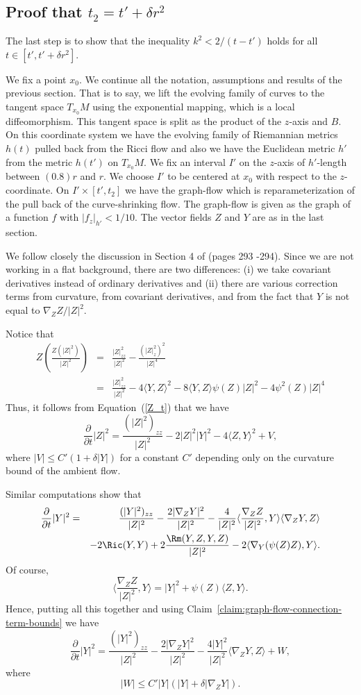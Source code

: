 \subsection{Proof that $t_2=t'+\delta r^2$}

The last step is to show that the inequality $k^2< 2/(t-t')$ holds
for all $t\in [t',t'+\delta r^2]$.

 We fix a point $x_0$. We continue all the notation, assumptions and results of the previous section.
 That is to say, we lift the evolving family of curves to the tangent space $T_{x_0}M$
 using the exponential mapping, which is a
 local diffeomorphism. This tangent space is split as the
product of the $z$-axis and $B$. On this coordinate system we have
the evolving family of Riemannian metrics $h(t)$ pulled back from
the Ricci flow and also we have the Euclidean metric $h'$ from the
metric $h(t')$ on $T_{x_0}M$. We fix an interval $I'$ on the
$z$-axis
  of $h'$-length between $(0.8)r$ and $r$.    We choose $I'$ to be centered at
 $x_0$ with respect to the $z$-coordinate. On $I'\times [t',t_2]$
  we have the graph-flow  which is reparameterization
  of the pull back of the curve-shrinking flow. The graph-flow is given as the graph
  of a function $f$ with $|f_z|_{h'}<1/10$. The vector fields $Z$
  and $Y$ are as in the last section.

 We follow closely the discussion in Section 4 of \cite{AG} (pages 293 -294).
 Since we are not working in a flat background, there are two
 differences:
 (i) we take covariant derivatives instead of ordinary derivatives
 and (ii) there are various correction terms from curvature, from covariant derivatives,
 and from the fact that $Y$ is not equal to $\nabla_ZZ/|Z|^2$.

Notice that
\begin{eqnarray*}
Z\left(\frac{Z(|Z|^2)}{|Z|^2}\right) & = & \frac{|Z|^2_{zz}}{|Z|^2}-
\frac{\left(|Z|^2_z\right)^2}{|Z|^4} \\
& = & \frac{|Z|^2_{zz}}{|Z|^2}-4\langle Y,Z\rangle^2 -8\langle
Y,Z\rangle \psi(Z)|Z|^2-4\psi^2(Z)|Z|^4 \end{eqnarray*}
 Thus, it
follows from Equation~(\ref{Z_t}) that we have
$$\frac{\partial}{\partial
 t}|Z|^2=\frac{(|Z|^2)_{zz}}{|Z|^2}-2|Z|^2|Y|^2-4\langle Z,Y\rangle^2+V,$$
where $|V|\le C'(1+\delta |Y|)$ for a constant $C'$ depending only
on the curvature bound of the ambient flow.

Similar computations show that
 \begin{eqnarray*}\frac{\partial}{\partial
 t}|Y|^2 & = &
\frac{(|Y|^2)_{zz}}{|Z|^2}-\frac{2|\nabla_ZY|^2}{|Z|^2}
 -\frac{4}{|Z|^2}\langle\frac{\nabla_ZZ}{|Z|^2},Y\rangle\langle
 \nabla_ZY,Z\rangle \\
 &  & -2\Ric(Y,Y)+2\frac{\Rm(Y,Z,Y,Z)}{|Z|^2}-2\langle \nabla_Y(\psi(Z)Z),Y\rangle.
 \end{eqnarray*}
Of course, $$\langle \frac{\nabla_ZZ}{|Z|^2},Y\rangle=|Y|^2+\psi(Z)\langle
Z,Y\rangle.$$ Hence, putting all this together and using Claim~\ref{claim:graph-flow-connection-term-bounds}
we have
$$\frac{\partial}{\partial
 t}|Y|^2  =
\frac{(|Y|^2)_{zz}}{|Z|^2}-\frac{2|\nabla_ZY|^2}{|Z|^2}
 -\frac{4|Y|^2}{|Z|^2}\langle
 \nabla_ZY,Z\rangle+W,$$
 where
 $$|W|\le C'|Y|(|Y|+\delta|\nabla_ZY|).$$


